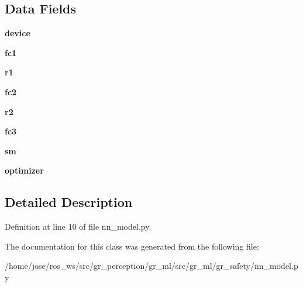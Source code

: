 \subsection*{Data Fields}
\begin{DoxyCompactItemize}
\item 
\mbox{\label{classgr__ml_1_1gr__safety_1_1nn__model_1_1NetworkModel_a85717d417caf0778b54c436ce9c9b84a}} 
{\bfseries device}
\item 
\mbox{\label{classgr__ml_1_1gr__safety_1_1nn__model_1_1NetworkModel_ade96879d122be08cfe35f0d1d7bb0b50}} 
{\bfseries fc1}
\item 
\mbox{\label{classgr__ml_1_1gr__safety_1_1nn__model_1_1NetworkModel_ad73637f1446fb299a1ac43d00aaa96cb}} 
{\bfseries r1}
\item 
\mbox{\label{classgr__ml_1_1gr__safety_1_1nn__model_1_1NetworkModel_a0313701aa3dbe718fe243fd8ebcbed4f}} 
{\bfseries fc2}
\item 
\mbox{\label{classgr__ml_1_1gr__safety_1_1nn__model_1_1NetworkModel_a70520ad9f6c51dea15ab8422c63ef73b}} 
{\bfseries r2}
\item 
\mbox{\label{classgr__ml_1_1gr__safety_1_1nn__model_1_1NetworkModel_ad40c2a3d79352525b1b3009ecca124b2}} 
{\bfseries fc3}
\item 
\mbox{\label{classgr__ml_1_1gr__safety_1_1nn__model_1_1NetworkModel_a5373eeab95b9d33401a72c92f4ed1681}} 
{\bfseries sm}
\item 
\mbox{\label{classgr__ml_1_1gr__safety_1_1nn__model_1_1NetworkModel_a50ddfb341599a11bb936d587aced1e52}} 
{\bfseries optimizer}
\end{DoxyCompactItemize}


\subsection{Detailed Description}


Definition at line 10 of file nn\+\_\+model.\+py.



The documentation for this class was generated from the following file\+:\begin{DoxyCompactItemize}
\item 
/home/jose/ros\+\_\+ws/src/gr\+\_\+perception/gr\+\_\+ml/src/gr\+\_\+ml/gr\+\_\+safety/nn\+\_\+model.\+py\end{DoxyCompactItemize}
